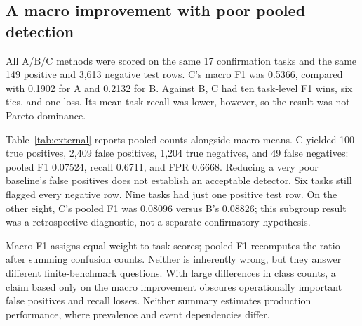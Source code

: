 \documentclass[10pt,twocolumn,letterpaper]{article}
\begin{document}
\subsection{A macro improvement with poor pooled detection}
All A/B/C methods were scored on the same 17 confirmation tasks and the same 149 positive and 3,613 negative test rows. C's macro F1 was 0.5366, compared with 0.1902 for A and 0.2132 for B. Against B, C had ten task-level F1 wins, six ties, and one loss. Its mean task recall was lower, however, so the result was not Pareto dominance.

Table~\ref{tab:external} reports pooled counts alongside macro means. C yielded 100 true positives, 2,409 false positives, 1,204 true negatives, and 49 false negatives: pooled F1 0.07524, recall 0.6711, and FPR 0.6668. Reducing a very poor baseline's false positives does not establish an acceptable detector. Six tasks still flagged every negative row. Nine tasks had just one positive test row. On the other eight, C's pooled F1 was 0.08096 versus B's 0.08826; this subgroup result was a retrospective diagnostic, not a separate confirmatory hypothesis.

Macro F1 assigns equal weight to task scores; pooled F1 recomputes the ratio after summing confusion counts. Neither is inherently wrong, but they answer different finite-benchmark questions. With large differences in class counts, a claim based only on the macro improvement obscures operationally important false positives and recall losses. Neither summary estimates production performance, where prevalence and event dependencies differ.
\end{document}
